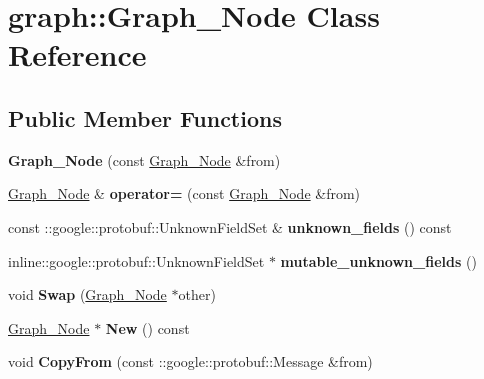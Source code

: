 \hypertarget{classgraph_1_1Graph__Node}{
\section{graph::Graph\_\-Node Class Reference}
\label{classgraph_1_1Graph__Node}
}
\subsection*{Public Member Functions}
\begin{DoxyCompactItemize}
\item 
\hypertarget{classgraph_1_1Graph__Node_a3e14dbbb1960cdceb42a22f191851a6b}{
{\bfseries Graph\_\-Node} (const \hyperlink{classgraph_1_1Graph__Node}{Graph\_\-Node} \&from)}
\label{classgraph_1_1Graph__Node_a3e14dbbb1960cdceb42a22f191851a6b}

\item 
\hypertarget{classgraph_1_1Graph__Node_a1b117f5f955e29ec6e990e50cc2026e0}{
\hyperlink{classgraph_1_1Graph__Node}{Graph\_\-Node} \& {\bfseries operator=} (const \hyperlink{classgraph_1_1Graph__Node}{Graph\_\-Node} \&from)}
\label{classgraph_1_1Graph__Node_a1b117f5f955e29ec6e990e50cc2026e0}

\item 
\hypertarget{classgraph_1_1Graph__Node_a1292a0d7a11d6709ee0a3bffd699ddc6}{
const ::google::protobuf::UnknownFieldSet \& {\bfseries unknown\_\-fields} () const }
\label{classgraph_1_1Graph__Node_a1292a0d7a11d6709ee0a3bffd699ddc6}

\item 
\hypertarget{classgraph_1_1Graph__Node_a458590dbf61732e966b050e46a5b9ee0}{
inline::google::protobuf::UnknownFieldSet $\ast$ {\bfseries mutable\_\-unknown\_\-fields} ()}
\label{classgraph_1_1Graph__Node_a458590dbf61732e966b050e46a5b9ee0}

\item 
\hypertarget{classgraph_1_1Graph__Node_a7161b02ad669bb3c0eba53b5231467d9}{
void {\bfseries Swap} (\hyperlink{classgraph_1_1Graph__Node}{Graph\_\-Node} $\ast$other)}
\label{classgraph_1_1Graph__Node_a7161b02ad669bb3c0eba53b5231467d9}

\item 
\hypertarget{classgraph_1_1Graph__Node_a155efedc0707beb8b2b1031acc23fb4d}{
\hyperlink{classgraph_1_1Graph__Node}{Graph\_\-Node} $\ast$ {\bfseries New} () const }
\label{classgraph_1_1Graph__Node_a155efedc0707beb8b2b1031acc23fb4d}

\item 
\hypertarget{classgraph_1_1Graph__Node_a5f3eca853b1a6ab6d72b95fc63edc476}{
void {\bfseries CopyFrom} (const ::google::protobuf::Message \&from)}
\label{classgraph_1_1Graph__Node_a5f3eca853b1a6ab6d72b95fc63edc476}


\end{DoxyCompactItemize}
